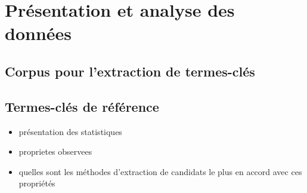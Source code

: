 \section{Présentation et analyse des données}
\label{sec:presentation_et_analyse_des_donnees}
  \subsection{Corpus pour l'extraction de termes-clés}
  \label{subsec:corpus_pour_l_extraction_de_termes_cles}

  \subsection{Termes-clés de référence}
  \label{subsec:termes_cles_de_reference}
    \begin{itemize}
      \item{présentation des statistiques}
      \item{proprietes observees}
      \item{quelles sont les méthodes d'extraction de candidats le plus en accord avec ces propriétés}
    \end{itemize}

